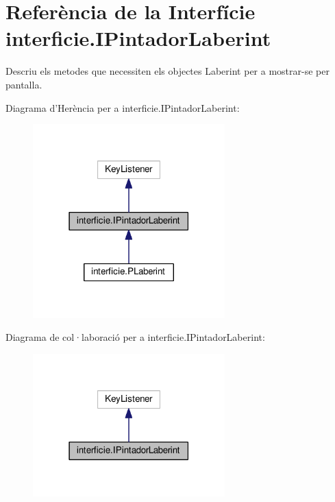 \hypertarget{interfaceinterficie_1_1_i_pintador_laberint}{\section{Referència de la Interfície interficie.\+I\+Pintador\+Laberint}
\label{interfaceinterficie_1_1_i_pintador_laberint}
}


Descriu els metodes que necessiten els objectes Laberint per a mostrar-\/se per pantalla.  




Diagrama d'Herència per a interficie.\+I\+Pintador\+Laberint\+:\nopagebreak
\begin{figure}[H]
\begin{center}
\leavevmode
\includegraphics[width=210pt]{interfaceinterficie_1_1_i_pintador_laberint__inherit__graph}
\end{center}
\end{figure}


Diagrama de col·laboració per a interficie.\+I\+Pintador\+Laberint\+:\nopagebreak
\begin{figure}[H]
\begin{center}
\leavevmode
\includegraphics[width=210pt]{interfaceinterficie_1_1_i_pintador_laberint__coll__graph}
\end{center}
\end{figure}

